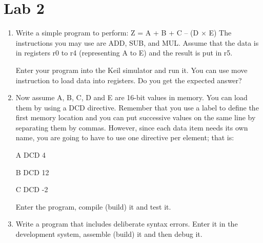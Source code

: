 \documentclass[letterpaper,10pt]{article}
\begin{document}
\section{Lab 2}
\begin{enumerate}
    \item Write a simple program to perform: Z = A + B + C – (D × E) 
    The instructions you may use are ADD, SUB, and MUL. Assume that the data is in registers r0 to r4 (representing A to E) and the result is put in r5. 
 
    Enter your program into the Keil simulator and run it. You can use move instruction to load data into registers. Do you get the expected answer?
    \item Now assume A, B, C, D and E are 16-bit values in memory. You can load them by using a DCD directive. Remember that you use a label to define the first memory location and you can put successive values on the same line by separating them by commas. However, since each data item needs its own name, you are going to have to use one directive per element; that is:
 
A DCD 4 

B DCD 12

C DCD -2 
 
Enter the program, compile (build) it and test it. 
    \item Write a program that includes deliberate syntax errors. Enter it in the development system, assemble (build) it and then debug it. 
\end{enumerate}
%
\end{document}
